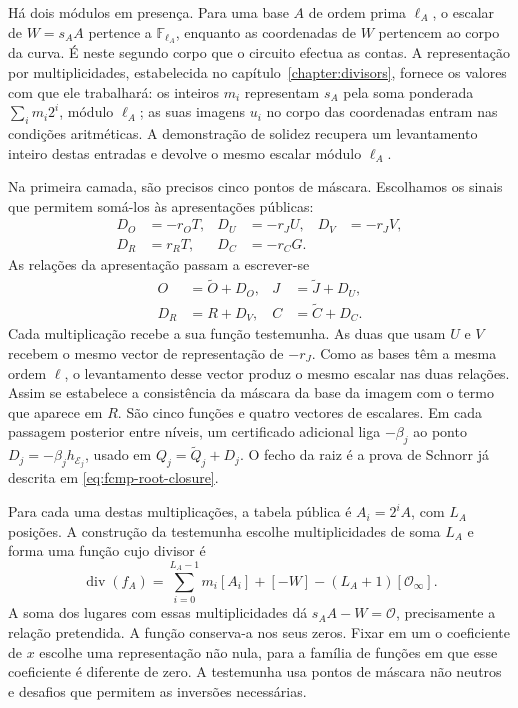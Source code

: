 Há dois módulos em presença. Para uma base \(A\) de ordem
prima \(\ell_A\), o escalar de \(W=s_AA\) pertence a
\(\mathbb F_{\ell_A}\), enquanto as coordenadas de \(W\)
pertencem ao corpo da curva. É neste segundo corpo que o
circuito efectua as contas. A representação por multiplicidades,
estabelecida no capítulo~\ref{chapter:divisors}, fornece os
valores com que ele trabalhará: os inteiros \(m_i\) representam
\(s_A\) pela soma ponderada \(\sum_i m_i2^i\), módulo
\(\ell_A\); as suas imagens \(u_i\) no corpo das coordenadas
entram nas condições aritméticas. A demonstração de solidez
recupera um levantamento inteiro destas entradas e devolve
o mesmo escalar módulo \(\ell_A\).

Na primeira camada, são precisos cinco pontos de máscara.
Escolhamos os sinais que permitem somá-los às apresentações
públicas:
\[
 \begin{aligned}
 D_O&=-r_OT,& D_U&=-r_JU,& D_V&=-r_JV,\\
 D_R&=r_RT,& D_C&=-r_CG.
 \end{aligned}
\]
As relações da apresentação passam a escrever-se
\begin{equation}
 \begin{aligned}
 O&=\widetilde O+D_O,& J&=\widetilde J+D_U,\\
 D_R&=R+D_V,& C&=\widetilde C+D_C.
 \end{aligned}
 \label{eq:fcmp-mask-certificate-relations}
\end{equation}
Cada multiplicação recebe a sua função testemunha. As duas
que usam \(U\) e \(V\) recebem o mesmo vector de representação
de \(-r_J\). Como as bases têm a mesma ordem \(\ell\), o
levantamento desse vector produz o mesmo escalar nas duas
relações. Assim se estabelece a consistência da máscara da
base da imagem com o termo que aparece em \(R\).
São cinco funções e quatro vectores de escalares. Em cada
passagem posterior entre níveis, um certificado adicional
liga \(-\beta_j\) ao ponto
\(D_j=-\beta_jh_{\mathcal E_j}\), usado em
\(Q_j=\widetilde Q_j+D_j\). O fecho da raiz é a prova de
Schnorr já descrita em \eqref{eq:fcmp-root-closure}.

Para cada uma destas multiplicações, a tabela pública é
\(A_i=2^iA\), com \(L_A\) posições. A construção da
testemunha escolhe multiplicidades de soma \(L_A\) e forma
uma função cujo divisor é
\begin{equation}
 \operatorname{div}(f_A)
   =\sum_{i=0}^{L_A-1}m_i[A_i]+[-W]
          -(L_A+1)[\mathcal O_\infty].
 \label{eq:fcmp-mask-divisor}
\end{equation}
A soma dos lugares com essas multiplicidades dá
\(s_AA-W=\mathcal O\), precisamente a relação pretendida.
A função conserva-a nos seus zeros. Fixar em um o coeficiente de
\(x\) escolhe uma representação não nula, para a
família de funções em que esse coeficiente é diferente de
zero. A testemunha usa pontos de máscara não neutros e
desafios que permitem as inversões necessárias.

